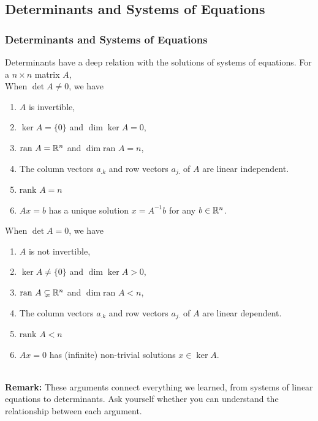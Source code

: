 \documentclass[12pt, t]{beamer}
\newcommand{\nullspace}{~\\[15pt]}
\newcommand{\remark}{\textbf{Remark: }}
\begin{document}
\subsection{Determinants and Systems of Equations}
\begin{frame}
    \frametitle{Determinants and Systems of Equations}
    Determinants have a deep relation with the solutions of systems of equations. For a $n\times n$ matrix $A$, \\[9pt]

    When $\det A \neq 0$, we have

    \begin{enumerate}
        \item $A$ is invertible,
        \item $\ker A = \{0\}$ and $\dim \ker A = 0$,
        \item $\text{ran }A=\mathbb{R}^n$ and $\dim \text{ran }A=n$,
        \item The column vectors $a_{.k}$ and row vectors $a_{j.}$ of $A$ are linear independent.
        \item $\text{rank }A=n$
        \item $Ax=b$ has a unique solution $x=A^{-1}b$ for any $b\in\mathbb{R}^n$.
    \end{enumerate}

    \newpage
    When $\det A = 0$, we have

    \begin{enumerate}
        \item $A$ is not invertible,
        \item $\ker A \neq \{0\}$ and $\dim \ker A > 0$,
        \item $\text{ran }A \subsetneq  \mathbb{R}^n$ and $\dim \text{ran }A<n$,
        \item The column vectors $a_{.k}$ and row vectors $a_{j.}$ of $A$ are linear dependent.
        \item $\text{rank }A<n$
        \item $Ax=0$ has (infinite) non-trivial solutions $x\in \ker A$.
    \end{enumerate}
    \nullspace
    \remark
    These arguments connect everything we learned, from systems of linear equations to determinants. Ask yourself whether you can understand the relationship between each argument.
\end{frame}
\end{document}
